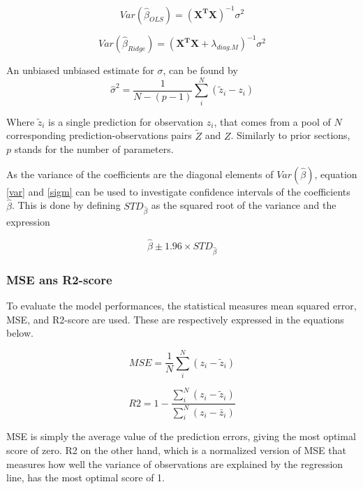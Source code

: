 \documentclass[...,numrefs]{wiley-article}
\begin{document}
\begin{equation}
    Var\left(\hat{\beta}_{OLS}\right) = (\boldsymbol{X^{T}X})^{-1}\sigma^2
    \label{var}
\end{equation}

\begin{equation}
    Var\left(\hat{\beta}_{Ridge}\right) = (\boldsymbol{X^{T}X}+\lambda_{diag.M})^{-1}\sigma^2
\end{equation}



An unbiased unbiased estimate for $\sigma$, can be found by 
\begin{equation}
    \hat{\sigma}^2 = \frac{1}{N-(p-1)}\sum_{i}^{N}(\tilde{z}_i-z_i)
    \label{sigm}
\end{equation}

Where $\tilde{z}_i$ is a single prediction for observation $z_i$, that comes from a pool of $N$ corresponding prediction-observations pairs $\tilde{Z}$ and $Z$. Similarly to prior sections, $p$ stands for the number of parameters. 
\newline

As the variance of the coefficients are the diagonal elements of $Var(\hat{\beta})$, equation \ref{var} and \ref{sigm} can be used to investigate confidence intervals of the coefficients $\hat{\beta}$. This is done by defining $STD_{\hat{\beta}}$ as the squared root of the variance and the expression

\begin{equation}
    \hat{\beta}{\pm}1.96\times{STD_{\hat{\beta}}}
\end{equation}

\subsubsection{MSE ans R2-score}
To evaluate the model performances, the statistical measures mean squared error, MSE, and R2-score are used. These are respectively expressed in the equations below.

\begin{equation}
    MSE = \frac{1}{N}\sum_i^N(z_i-\tilde{z}_i)
\end{equation}


\begin{equation}
    R2 = 1-\frac{\sum_i^N(z_i-\tilde{z}_i)}{\sum_i^N(z_i-\bar{z}_i)}
\end{equation}

MSE is simply the average value of the prediction errors, giving the most optimal score of zero. R2 on the other hand, which is a normalized version of MSE that measures how well the variance of observations are explained by the regression line, has the most optimal score of 1.   
\end{document}
